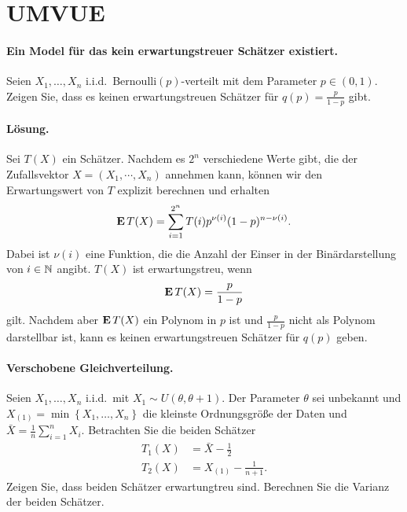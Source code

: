 \section{UMVUE}

\paragraph{Ein Model für das kein erwartungstreuer Schätzer existiert.}
Seien $X_1,\ldots,X_n$ i.i.d.\ Bernoulli$(p)$-verteilt mit dem Parameter $p \in
(0,1)$.  Zeigen Sie, dass es keinen erwartungstreuen Schätzer für $q(p) =
\frac{p}{1-p}$ gibt. 

\paragraph*{Lösung.} Sei $T(X)$ ein Schätzer. Nachdem es $2^n$ verschiedene
Werte gibt, die der Zufallsvektor $X = (X_1, \cdots, X_n)$ annehmen kann, können 
wir den Erwartungswert von $T$ explizit berechnen und erhalten
\begin{equation*}
    \mathbf{E} \, T(X) = \sum_{i = 1}^{2^n} T(i) p^{\nu(i)}(1-p)^{n - \nu(i)}.
\end{equation*}
Dabei ist $\nu(i)$ eine Funktion, die die Anzahl der Einser in der
Binärdarstellung von $i\in \mathbb N$ angibt. $T(X)$ ist erwartungstreu, wenn 
\begin{equation*}
    \mathbf{E} \, T(X) = \frac{p}{1-p}
\end{equation*}
gilt. Nachdem aber $\mathbf{E}\, T(X)$ ein Polynom in $p$ ist und $\frac{p}{1-p}$ nicht
als Polynom darstellbar ist, kann es keinen erwartungstreuen Schätzer für
$q(p)$ geben. 


\paragraph{Verschobene Gleichverteilung. } 
Seien $X_1,\ldots,X_n$ i.i.d.\ mit $X_1\sim U(\theta,\theta+1)$. Der Parameter
$\theta$ sei  unbekannt und $X_{(1)}=\min\left\{ X_1,\ldots,X_n \right\}$ die
kleinste Ordnungsgröße der Daten und $\bar X= \frac{1}{n}\sum_{i=1}^{n}X_i$.
Betrachten Sie die beiden Schätzer 
\begin{align*}
	T_1(X) &= \bar X - \frac{1}{2} \\
	T_2(X) &=  X_{(1)} - \frac{1}{n+1}.
\end{align*}
Zeigen Sie, dass beiden Schätzer erwartungtreu sind. Berechnen Sie 
die Varianz der beiden Schätzer.

